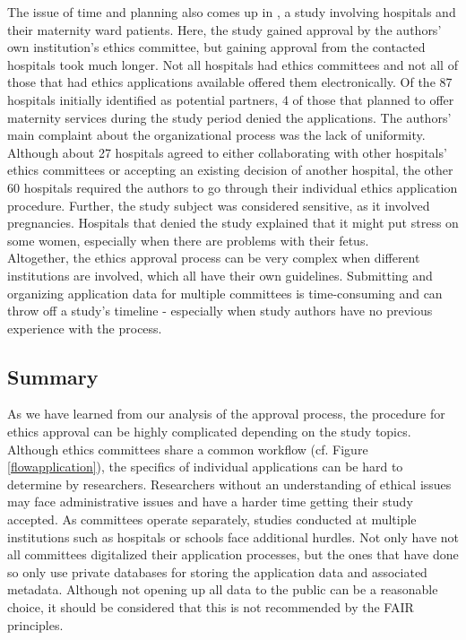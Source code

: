 \documentclass[10pt]{article}
\begin{document}
The issue of time and planning also comes up in \cite{rephospital}, a study involving hospitals and their maternity ward patients. Here, the study gained approval by the authors' own institution's ethics committee, but gaining approval from the contacted hospitals took much longer. Not all hospitals had ethics committees and not all of those that had ethics applications available offered them electronically. Of the 87 hospitals initially identified as potential partners, 4 of those that planned to offer maternity services during the study period denied the applications. The authors' main complaint about the organizational process was the lack of uniformity. Although about 27 hospitals agreed to either collaborating with other hospitals' ethics committees or accepting an existing decision of another hospital, the other 60 hospitals required the authors to go through their individual ethics application procedure. 
Further, the study subject was considered sensitive, as it involved pregnancies. Hospitals that denied the study explained that it might put stress on some women, especially when there are problems with their fetus. 
\\

Altogether, the ethics approval process can be very complex when different institutions are involved, which all have their own guidelines. Submitting and organizing application data for multiple committees is time-consuming and can throw off a study's timeline - especially when study authors have no previous experience with the process.

\subsection{Summary}
As we have learned from our analysis of the approval process, the procedure for ethics approval can be highly complicated depending on the study topics. Although ethics committees share a common workflow (cf. Figure \ref{flowapplication}), the specifics of individual applications can be hard to determine by researchers. Researchers without an understanding of ethical issues may face administrative issues and have a harder time getting their study accepted. As committees operate separately, studies conducted at multiple institutions such as hospitals or schools face additional hurdles. Not only have not all committees digitalized their application processes, but the ones that have done so only use private databases for storing the application data and associated metadata. Although not opening up all data to the public can be a reasonable choice, it should be considered that this is not recommended by the FAIR principles. 
\end{document}
